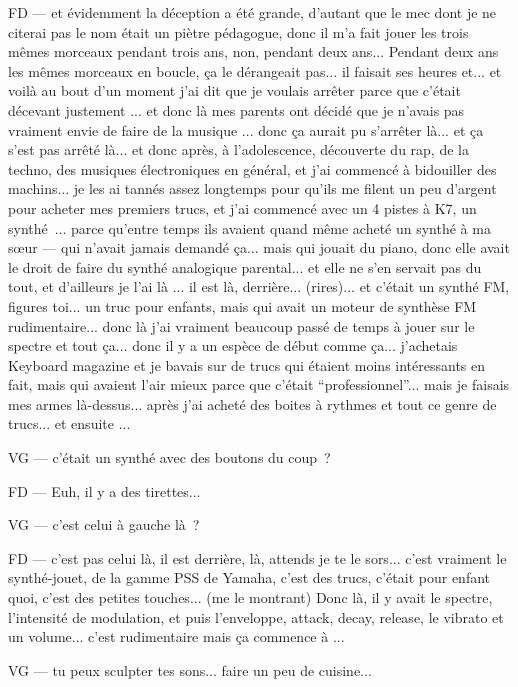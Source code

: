 FD — et évidemment la déception a été grande, d'autant que le mec dont je ne citerai pas le nom était un piètre pédagogue, donc il m'a fait jouer les trois mêmes morceaux pendant trois ans, non, pendant deux ans... Pendant deux ans les mêmes morceaux en boucle, ça le dérangeait pas... il faisait ses heures et... et voilà au bout d'un moment j'ai dit que je voulais arrêter parce que c'était décevant justement ... et donc là mes parents ont décidé que je n'avais pas vraiment envie de faire de la musique ... donc ça aurait pu s'arrêter là... et ça s'est pas arrêté là... et donc après, à l'adolescence, découverte du rap, de la techno, des musiques électroniques en général, et j'ai commencé à bidouiller des machins... je les ai tannés assez longtemps pour qu'ils me filent un peu d'argent pour acheter mes premiers trucs, et j'ai commencé avec un 4 pistes à K7, un synthé ... parce qu'entre temps ils avaient quand même acheté un synthé à ma sœur — qui n'avait jamais demandé ça... mais qui jouait du piano, donc elle avait le droit de faire du synthé analogique parental... et elle ne s'en servait pas du tout, et d'ailleurs je l'ai là ... il est là, derrière... (rires)... et c'était un synthé FM, figures toi... un truc pour enfants, mais qui avait un moteur de synthèse FM rudimentaire... donc là j'ai vraiment beaucoup passé de temps à jouer sur le spectre et tout ça... donc il y a un espèce de début comme ça... j'achetais Keyboard magazine et je bavais sur de trucs qui étaient moins intéressants en fait, mais qui avaient l'air mieux parce que c'était ``professionnel''... mais je faisais mes armes là-dessus... après j'ai acheté des boites à rythmes et tout ce genre de trucs... et ensuite ... 

VG — c'était un synthé avec des boutons du coup ? 

FD — Euh, il y a des tirettes... 

VG — c'est celui à gauche là ? 

FD — c'est pas celui là, il est derrière, là, attends je te le sors... c'est vraiment le synthé-jouet, de la gamme PSS de Yamaha, c'est des trucs, c'était pour enfant quoi, c'est des petites touches... (me le montrant) Donc là, il y avait le spectre, l'intensité de modulation, et puis l'enveloppe, attack, decay, release, le vibrato et un volume... c'est rudimentaire mais ça commence à ... 

VG — tu peux sculpter tes sons... faire un peu de cuisine... 

